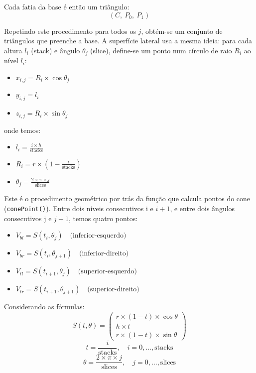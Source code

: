 \documentclass[11pt, a4paper, fleqn]{article}
\begin{document}
\noindent Cada fatia da base é então um triângulo:
\[
(C,\ P_0,\ P_1)
\]

\noindent Repetindo este procedimento para todos os $j$, obtém-se um conjunto de triângulos que preenche a base. A superfície lateral usa a mesma ideia: para cada altura $l_i$ (stack) e ângulo $\theta_j$ (slice), define-se um ponto num círculo de raio $R_i$ ao nível $l_i$:
\begin{itemize}
    \item $x_{i,j} = R_i \times \cos\theta_j$
    \item $y_{i,j} = l_i$
    \item $z_{i,j} = R_i \times \sin\theta_j$
\end{itemize}

\newpage

\noindent onde temos:
\begin{itemize}
    \item $l_i = \frac{i \times h}{\text{stacks}}$
    \item $R_i = r \times \left(1-\frac{i}{\text{stacks}}\right)$
    \item $\theta_j = \frac{2 \times \pi \times j}{\text{slices}}$
\end{itemize}

\noindent Este é o procedimento geométrico por trás da função que calcula pontos do cone (\texttt{conePoint()}). Entre dois níveis consecutivos i e $i+1$, e entre dois ângulos consecutivos j e $j+1$, temos quatro pontos:
\begin{itemize}
    \item $V_{bl} = S(t_i, \theta_j)
\quad\text{(inferior-esquerdo)}$
    \item $V_{br} = S(t_i, \theta_{j+1})
\quad\text{(inferior-direito)}$
    \item $V_{tl} = S(t_{i+1}, \theta_j)
\quad\text{(superior-esquerdo)}$
    \item $V_{tr} = S(t_{i+1}, \theta_{j+1})
\quad\text{(superior-direito)}$
\end{itemize}

\noindent Considerando as fórmulas:
\[
    S(t,\theta) =
    \begin{pmatrix}
        r \times (1-t) \times \cos\theta \\
        h \times t \\
        r \times (1-t) \times \sin\theta
    \end{pmatrix}
\]
\[
t = \frac{i}{\text{stacks}}, \quad i=0,\dots,\text{stacks}
\]
\[
\theta = \frac{2 \times \pi \times j}{\text{slices}}, \quad j=0,\dots,\text{slices}
\]
\end{document}
